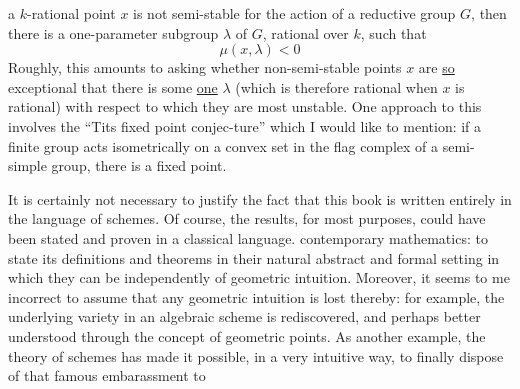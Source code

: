 
a $k$-rational point $x$ is not semi-stable for the action of a reductive group $G$, then there is a one-parameter subgroup $\lambda$ of $G$, rational over $k$, such that
\[
\mu(x,\lambda)<0
\]
Roughly, this amounts to asking whether non-semi-stable points $x$ are \uline{so} exceptional that there is some \uline{one} $\lambda$ (which is therefore rational when $x$ is rational) with respect to which they are most unstable. One approach to this involves the ``Tits fixed point conjec-ture'' which I would like to mention: if a finite group acts isometrically on a convex set in the flag complex of a semi-simple group, there is a fixed point.

It is certainly not necessary to justify the fact that this book is written entirely in the language of schemes. Of course, the results, for most purposes, could have been stated and proven in a classical language.
contemporary mathematics: to state its definitions and theorems in their natural abstract and formal setting in which they can be   independently of geometric intuition. Moreover, it seems to me incorrect to assume that any geometric intuition is lost thereby: for example, the underlying variety in an algebraic scheme is rediscovered, and perhaps better understood through the concept of geometric points. As another example, the theory of schemes has made it possible, in a very intuitive way, to finally dispose of that famous embarassment to

